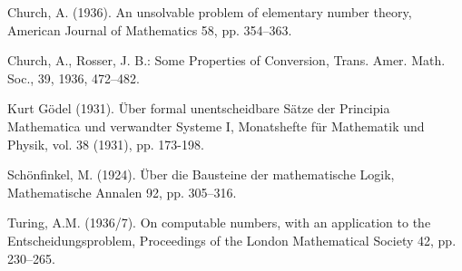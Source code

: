 \begin{thebibliography}{99}

 Church, A. (1936). An unsolvable problem of elementary number theory, American
Journal of Mathematics 58, pp. 354–363.

 Church, A., Rosser, J. B.: Some Properties of Conversion, Trans. Amer. Math. Soc., 39, 1936, 472–482.


 Kurt Gödel (1931). Über formal unentscheidbare Sätze der
  Principia Mathematica und verwandter Systeme I, Monatshefte für Mathematik
  und Physik, vol. 38 (1931), pp. 173-198.

 Schönfinkel, M. (1924). Über die Bausteine der mathematische Logik, Mathematische
Annalen 92, pp. 305–316.

 Turing, A.M. (1936/7). On computable numbers, with an application to the
Entscheidungsproblem, Proceedings of the London Mathematical Society
42, pp. 230–265.

\end{thebibliography}
